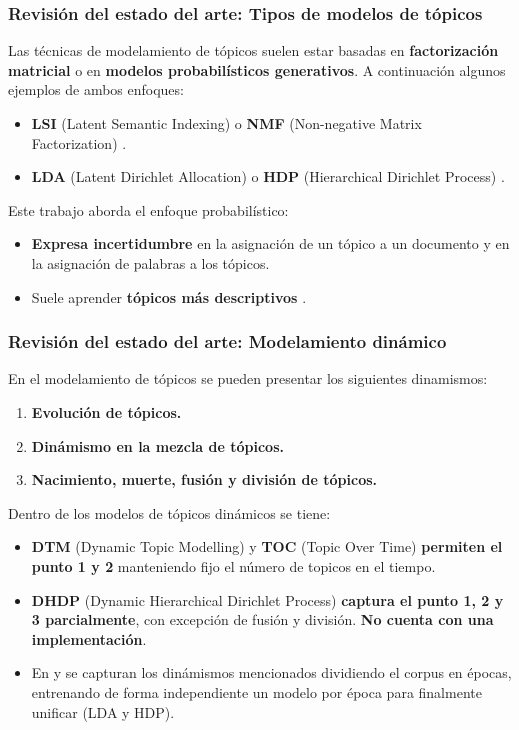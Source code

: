 \documentclass[
	spanish, %
	aspectratio=43, %
	hyperref={pdfencoding=auto,psdextra},
	xcolor={dvipsnames,table,usenames},
]{beamer}
\begin{document}
\begin{frame}[t]
\frametitle{Revisión del estado del arte: Tipos de modelos de tópicos}
Las técnicas de modelamiento de tópicos suelen estar basadas en \textbf{factorización matricial} o en \textbf{modelos probabilísticos generativos}. 
\newline\newline
A continuación algunos ejemplos de ambos enfoques:

\begin{itemize}
  \item \textbf{LSI} (Latent Semantic Indexing) \cite{dumais2004latent} o \textbf{NMF} (Non-negative Matrix Factorization) \cite{xu2003document}. 
  \item \textbf{LDA} (Latent Dirichlet Allocation) \cite{blei2003latent} o \textbf{HDP} (Hierarchical Dirichlet Process) \cite{teh2005sharing}. 
\end{itemize} 

Este trabajo aborda el enfoque probabilístico: 
\begin{itemize}
  \item \textbf{Expresa incertidumbre} en la asignación de un tópico a un documento y en la asignación de palabras a los tópicos.
  \item Suele aprender \textbf{tópicos más descriptivos} \cite{stevens2012exploring}.
\end{itemize}

\end{frame}


\begin{frame}[t]
\frametitle{Revisión del estado del arte: Modelamiento dinámico}
En el modelamiento de tópicos se pueden presentar los siguientes dinamismos:

\begin{enumerate}
  \item \textbf{Evolución de tópicos.}
  \item \textbf{Dinámismo en la mezcla de tópicos.}
  \item \textbf{Nacimiento, muerte, fusión y división de tópicos.}
\end{enumerate}

Dentro de los modelos de tópicos dinámicos se tiene:
\begin{itemize}
  \item \textbf{DTM} (Dynamic Topic Modelling) \cite{blei2006dynamic} y \textbf{TOC} (Topic Over Time) \cite{wang2006topics} \textbf{permiten el punto 1 y 2} manteniendo fijo el número de topicos en el tiempo.
  \item \textbf{DHDP} (Dynamic Hierarchical Dirichlet Process) \cite{ahmed2012timeline} \textbf{captura el punto 1, 2 y 3 parcialmente}, con excepción de fusión y división. \textbf{No cuenta con una implementación}.\\
  \item En \cite{wilson2011tracking} y \cite{beykikhoshk2018discovering} se capturan los dinámismos mencionados dividiendo el corpus en épocas, entrenando de forma independiente un modelo por época para finalmente unificar (LDA y HDP).
\end{itemize}
\end{frame}
\end{document}
